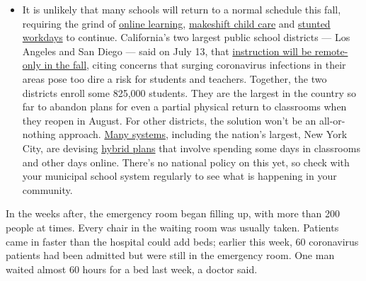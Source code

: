 \begin{itemize}
  \begin{itemize}
  \tightlist
  \item
    It is unlikely that many schools will return to a normal schedule
    this fall, requiring the grind of
    \href{https://www.nytimes.com/2020/06/05/us/coronavirus-education-lost-learning.html?action=click\&pgtype=Article\&state=default\&region=MAIN_CONTENT_3\&context=storylines_faq}{online
    learning},
    \href{https://www.nytimes.com/2020/05/29/us/coronavirus-child-care-centers.html?action=click\&pgtype=Article\&state=default\&region=MAIN_CONTENT_3\&context=storylines_faq}{makeshift
    child care} and
    \href{https://www.nytimes.com/2020/06/03/business/economy/coronavirus-working-women.html?action=click\&pgtype=Article\&state=default\&region=MAIN_CONTENT_3\&context=storylines_faq}{stunted
    workdays} to continue. California's two largest public school
    districts --- Los Angeles and San Diego --- said on July 13, that
    \href{https://www.nytimes.com/2020/07/13/us/lausd-san-diego-school-reopening.html?action=click\&pgtype=Article\&state=default\&region=MAIN_CONTENT_3\&context=storylines_faq}{instruction
    will be remote-only in the fall}, citing concerns that surging
    coronavirus infections in their areas pose too dire a risk for
    students and teachers. Together, the two districts enroll some
    825,000 students. They are the largest in the country so far to
    abandon plans for even a partial physical return to classrooms when
    they reopen in August. For other districts, the solution won't be an
    all-or-nothing approach.
    \href{https://bioethics.jhu.edu/research-and-outreach/projects/eschool-initiative/school-policy-tracker/}{Many
    systems}, including the nation's largest, New York City, are
    devising
    \href{https://www.nytimes.com/2020/06/26/us/coronavirus-schools-reopen-fall.html?action=click\&pgtype=Article\&state=default\&region=MAIN_CONTENT_3\&context=storylines_faq}{hybrid
    plans} that involve spending some days in classrooms and other days
    online. There's no national policy on this yet, so check with your
    municipal school system regularly to see what is happening in your
    community.
  \end{itemize}
\end{itemize}

In the weeks after, the emergency room began filling up, with more than
200 people at times. Every chair in the waiting room was usually taken.
Patients came in faster than the hospital could add beds; earlier this
week, 60 coronavirus patients had been admitted but were still in the
emergency room. One man waited almost 60 hours for a bed last week, a
doctor said.

